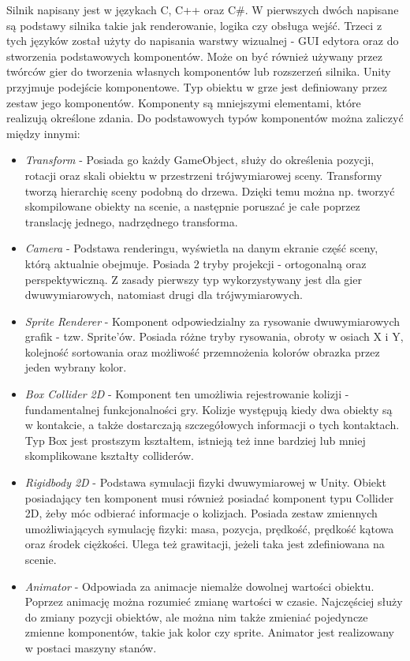 \documentclass[a4paper,12pt,twoside,openany]{report}
\begin{document}
Silnik napisany jest w językach C, C++ oraz C\#. W pierwszych dwóch napisane są podstawy silnika takie jak renderowanie, logika czy obsługa wejść. Trzeci z tych języków został użyty do napisania warstwy wizualnej - GUI edytora oraz do stworzenia podstawowych komponentów. Może on być również używany przez twórców gier do tworzenia własnych komponentów lub rozszerzeń silnika. Unity przyjmuje podejście komponentowe. Typ obiektu w grze jest definiowany przez zestaw jego komponentów. Komponenty są mniejszymi elementami, które realizują określone zdania. Do podstawowych typów komponentów można zaliczyć między innymi:
\begin{itemize}
    \item \textit{Transform} - Posiada go każdy GameObject, służy do określenia pozycji, rotacji oraz skali obiektu w przestrzeni trójwymiarowej sceny. Transformy tworzą hierarchię sceny podobną do drzewa. Dzięki temu można np. tworzyć skompilowane obiekty na scenie, a następnie poruszać je całe poprzez translację jednego, nadrzędnego transforma.
    \item \textit{Camera} - Podstawa renderingu, wyświetla na danym ekranie część sceny, którą aktualnie obejmuje. Posiada 2 tryby projekcji - ortogonalną oraz perspektywiczną. Z zasady pierwszy typ wykorzystywany jest dla gier dwuwymiarowych, natomiast drugi dla trójwymiarowych.
    \item \textit{Sprite Renderer} - Komponent odpowiedzialny za rysowanie dwuwymiarowych grafik - tzw. Sprite'ów. Posiada różne tryby rysowania, obroty w osiach X i Y, kolejność sortowania oraz możliwość przemnożenia kolorów obrazka przez jeden wybrany kolor.
    \item \textit{Box Collider 2D} - Komponent ten umożliwia rejestrowanie kolizji - fundamentalnej funkcjonalności gry. Kolizje występują kiedy dwa obiekty są w kontakcie, a także dostarczają szczegółowych informacji o tych kontaktach. Typ Box jest prostszym kształtem, istnieją też inne bardziej lub mniej skomplikowane kształty colliderów.
    \item \textit{Rigidbody 2D} - Podstawa symulacji fizyki dwuwymiarowej w Unity. Obiekt posiadający ten komponent musi również posiadać komponent typu Collider 2D, żeby móc odbierać informacje o kolizjach. Posiada zestaw zmiennych umożliwiających symulację fizyki: masa, pozycja, prędkość, prędkość kątowa oraz środek ciężkości. Ulega też grawitacji, jeżeli taka jest zdefiniowana na scenie.
    \item \textit{Animator} - Odpowiada za animacje niemalże dowolnej wartości obiektu. Poprzez animację można rozumieć zmianę wartości w czasie. Najczęściej służy do zmiany pozycji obiektów, ale można nim także zmieniać pojedyncze zmienne komponentów, takie jak kolor czy sprite. Animator jest realizowany w postaci maszyny stanów.

\end{itemize}
\end{document}
